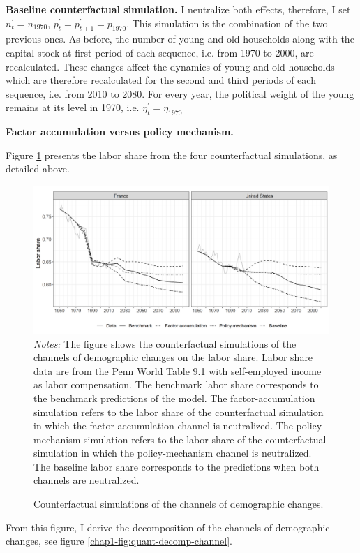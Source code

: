 \textbf{Baseline counterfactual simulation.} I neutralize both effects, therefore, I set $n^\prime_t = n_{1970}$, $p^\prime_t = p^\prime_{t+1} = p_{1970}$. This simulation is the combination of the two previous ones. As before, the number of young and old households along with the capital stock at first period of each sequence, i.e. from 1970 to 2000, are recalculated. These changes affect the dynamics of young and old households which are therefore recalculated for the second and third periods of each sequence, i.e. from 2010 to 2080.
For every year, the political weight of the young remains at its level in 1970, i.e. $\eta^\prime_t = \eta_{1970}$

\textbf{Factor accumulation versus policy mechanism.} 

Figure \ref{chap1-fig:quant-counter-channel} presents the labor share from the four counterfactual simulations, as detailed above.
\begin{figure}[!htb]
	\centering
	\caption{Counterfactual simulations of the channels of demographic changes.} \label{chap1-fig:quant-counter-channel}
	\includegraphics[width=1\linewidth]{chap1/graphic/quant-counter-channel.png}
	\vspace{-3em}
	\justify\singlespacing\footnotesize\textit{Notes:} The figure shows the counterfactual simulations of the channels of demographic changes on the labor share. 
	Labor share data are from the \href{https://www.rug.nl/ggdc/productivity/pwt/}{Penn World Table 9.1} with self-employed income as labor compensation.
	The benchmark labor share corresponds to the benchmark predictions of the model. The factor-accumulation simulation refers to the labor share of the counterfactual simulation in which the factor-accumulation channel is neutralized. The policy-mechanism simulation refers to the labor share of the counterfactual simulation in which the policy-mechanism channel is neutralized. The baseline labor share corresponds to the predictions when both channels are neutralized.
\end{figure}
From this figure, I derive the decomposition of the channels of demographic changes, see figure \ref{chap1-fig:quant-decomp-channel}.